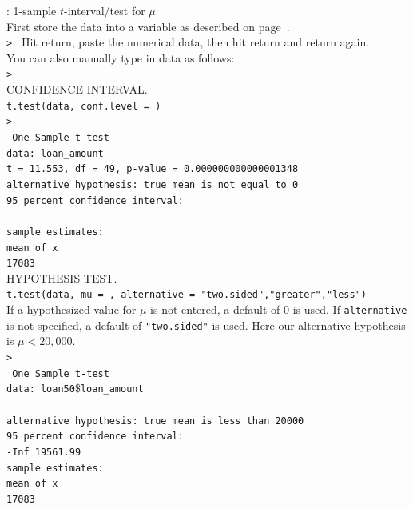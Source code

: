 \newpage
\noindent \R{}:  1-sample $t$-interval/test for $\mu$\\

\noindent First store the data into a variable as described on page~\pageref{rDescriptive}.  \\
\texttt{> } \hspace{3mm}  Hit return, paste the numerical data, then hit return and return again.\\

\noindent You can also manually type in data as follows:\\
\texttt{> }\\


\noindent CONFIDENCE INTERVAL.
\\ \texttt{t.test(data, conf.level =  )} \\

\noindent \texttt{> }\\  
\texttt{
	One Sample t-test\\
data:  loan\_amount\\
t = 11.553, df = 49, p-value = 0.000000000000001348\\
alternative hypothesis: true mean is not equal to 0\\
95 percent confidence interval:\\
\\
sample estimates:\\
mean of x \\
    17083 }\\ 


\noindent HYPOTHESIS TEST.  
\\ \texttt{t.test(data, mu = ,  alternative = "two.sided","greater","less")}\\

\noindent If a hypothesized value for $\mu$ is not entered, a default of 0 is used.  If \texttt{alternative} is not specified, a default of \texttt{"two.sided"} is used.  Here our alternative hypothesis is $\mu < 20,000$. \\

\noindent \texttt{> }\\
\texttt{
	One Sample t-test\\
data:  loan50$\$$loan\_amount\\
\\
alternative hypothesis: true mean is less than 20000\\
95 percent confidence interval:\\
     -Inf 19561.99\\
sample estimates:\\
mean of x \\
    17083 }\\ \\

